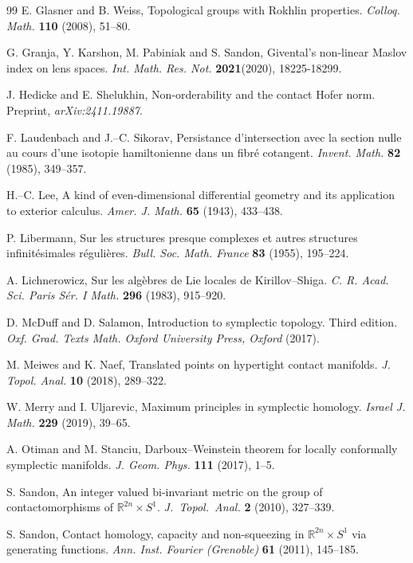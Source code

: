 \documentclass{amsart}
\theoremstyle{remark}
\begin{document}
\begin{thebibliography}{99}
 E. Glasner and B. Weiss, Topological groups with Rokhlin properties. \textit{Colloq. Math.} \textbf{110} (2008), 51--80.

 G. Granja, Y. Karshon, M. Pabiniak and S. Sandon, Givental's non-linear Maslov index on lens spaces. \textit{Int. Math. Res. Not.} \textbf{2021}(2020), 18225-18299.

 J. Hedicke and E. Shelukhin, Non-orderability and the contact Hofer norm. Preprint, \textit{arXiv:2411.19887}.

 F. Laudenbach and J.--C. Sikorav, Persistance d'intersection avec la section nulle au cours d'une isotopie hamiltonienne dans un fibr\'e cotangent. \textit{Invent. Math.} \textbf{82} (1985), 349--357.

 H.--C. Lee, A kind of even-dimensional differential geometry and its application to exterior calculus. \textit{Amer. J. Math.} \textbf{65} (1943), 433--438.

 P. Libermann, Sur les structures presque complexes et autres structures infinitésimales régulières. \textit{Bull. Soc. Math. France} \textbf{83} (1955), 195--224.

 A. Lichnerowicz, Sur les alg\`{e}bres de Lie locales de Kirillov--Shiga. \textit{C. R. Acad. Sci. Paris S\'er. I Math.} \textbf{296} (1983), 915--920.

 D. McDuff and D. Salamon, Introduction to symplectic topology. Third edition.
\textit{Oxf. Grad. Texts Math. Oxford University Press, Oxford} (2017).

 M. Meiwes and K. Naef, Translated points on hypertight contact manifolds. \textit{J. Topol. Anal.} \textbf{10} (2018), 289--322.

 W. Merry and I. Uljarevic, Maximum principles in symplectic homology. \textit{Israel J. Math.} \textbf{229} (2019), 39--65.

 A. Otiman and M. Stanciu, Darboux--Weinstein theorem for locally conformally symplectic manifolds. \textit{J. Geom. Phys.} \textbf{111} (2017), 1--5.

 S. Sandon, An integer valued bi-invariant metric on the group of contactomorphisms of $\mathbb{R}^{2n}\times S^{1}$. \textit{J.\ Topol.\  Anal.} \textbf{2} (2010), 327--339. 

 S. Sandon, Contact homology, capacity and non-squeezing in $\mathbb{R}^{2n} \times S^1$ via generating functions. \textit{Ann. Inst. Fourier (Grenoble)} \textbf{61} (2011), 145--185.


\end{thebibliography}
\end{document}
